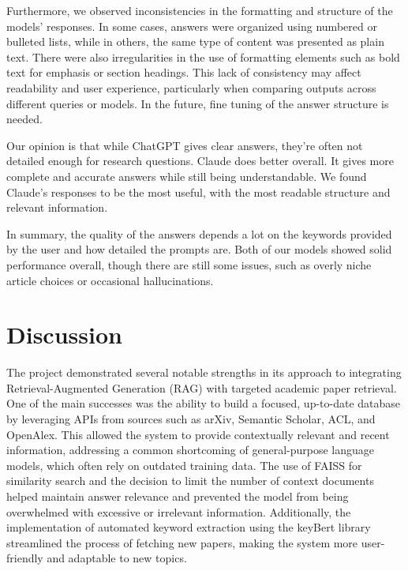 \documentclass[fleqn,moreauthors,10pt]{ds_report}
\begin{document}
Furthermore, we observed inconsistencies in the formatting and structure of the models’ responses. In some cases, answers were organized using numbered or bulleted lists, while in others, the same type of content was presented as plain text. There were also irregularities in the use of formatting elements such as bold text for emphasis or section headings. This lack of consistency may affect readability and user experience, particularly when comparing outputs across different queries or models. In the future, fine tuning of the answer structure is needed.

Our opinion is that while ChatGPT gives clear answers, they're often not detailed enough for research questions. Claude does better overall. It gives more complete and accurate answers while still being understandable. We found Claude's responses to be the most useful, with the most readable structure and relevant information.

In summary, the quality of the answers depends a lot on the keywords provided by the user and how detailed the prompts are. Both of our models showed solid performance overall, though there are still some issues, such as overly niche article choices or occasional hallucinations. 



\section*{Discussion}

The project demonstrated several notable strengths in its approach to integrating Retrieval-Augmented Generation (RAG) with targeted academic paper retrieval. One of the main successes was the ability to build a focused, up-to-date database by leveraging APIs from sources such as arXiv, Semantic Scholar, ACL, and OpenAlex. This allowed the system to provide contextually relevant and recent information, addressing a common shortcoming of general-purpose language models, which often rely on outdated training data. The use of FAISS for similarity search and the decision to limit the number of context documents helped maintain answer relevance and prevented the model from being overwhelmed with excessive or irrelevant information. Additionally, the implementation of automated keyword extraction using the keyBert library streamlined the process of fetching new papers, making the system more user-friendly and adaptable to new topics.
\end{document}
